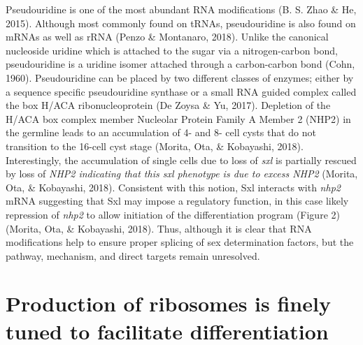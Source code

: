 \documentclass[12pt,oneside]{reedthesis}
\begin{document}
Pseudouridine is one of the most abundant RNA modifications
(B. S. Zhao \& He, 2015). Although most commonly found on tRNAs, pseudouridine is
also found on mRNAs as well as rRNA (Penzo \& Montanaro, 2018). Unlike the
canonical nucleoside uridine which is attached to the sugar via a
nitrogen-carbon bond, pseudouridine is a uridine isomer attached through
a carbon-carbon bond (Cohn, 1960). Pseudouridine can be placed by two
different classes of enzymes; either by a sequence specific
pseudouridine synthase or a small RNA guided complex called the box
H/ACA ribonucleoprotein (De Zoysa \& Yu, 2017). Depletion of the H/ACA box
complex member Nucleolar Protein Family A Member 2 (NHP2) in the
germline leads to an accumulation of 4- and 8- cell cysts that do not
transition to the 16-cell cyst stage (Morita, Ota, \& Kobayashi, 2018). Interestingly,
the accumulation of single cells due to loss of \emph{sxl} is partially
rescued by loss of \emph{NHP2 indicating that this sxl phenotype is due to
excess NHP2} (Morita, Ota, \& Kobayashi, 2018). Consistent with this notion, Sxl
interacts with \emph{nhp2} mRNA suggesting that Sxl may impose a regulatory
function, in this case likely repression of \emph{nhp2} to allow initiation
of the differentiation program (Figure 2) (Morita, Ota, \& Kobayashi, 2018). Thus,
although it is clear that RNA modifications help to ensure proper
splicing of sex determination factors, but the pathway, mechanism, and
direct targets remain unresolved.

\hypertarget{production-of-ribosomes-is-finely-tuned-to-facilitate-differentiation}{%
\section{Production of ribosomes is finely tuned to facilitate differentiation}\label{production-of-ribosomes-is-finely-tuned-to-facilitate-differentiation}}
\end{document}
